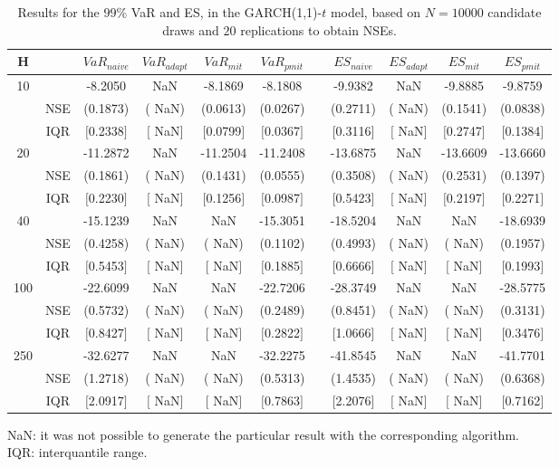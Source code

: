 \begin{table}[h] 
\centering 
\caption{Results for the $99\%$ VaR and ES, in the GARCH(1,1)-$t$ model, based on $N=10000$ candidate draws and $20$ replications to obtain NSEs.} 
\label{tab:res_algos_t_garch2_noS} 
\begin{tabular}{ccccccccccc}  
 H & & $VaR_{naive}$ & $VaR_{adapt}$ & $VaR_{mit}$  & $VaR_{pmit}$ &  & $ES_{naive}$ & $ES_{adapt}$ & $ES_{mit}$ & $ES_{pmit}$ \\ \hline 
10 & & -8.2050 &    NaN & -8.1869 & -8.1808 & & -9.9382 &    NaN & -9.8885 & -9.8759  \\ 
  & NSE & (0.1873) & (   NaN) & (0.0613) & (0.0267) & & (0.2711) & (   NaN) & (0.1541) & (0.0838)   \\ 
 & IQR & $[$0.2338$]$ & $[$   NaN$]$ & $[$0.0799$]$ & $[$0.0367$]$ & & $[$0.3116$]$ & $[$   NaN$]$ & $[$0.2747$]$ & $[$0.1384$]$  \\ [1ex] 
20 & & -11.2872 &    NaN & -11.2504 & -11.2408 & & -13.6875 &    NaN & -13.6609 & -13.6660  \\ 
  & NSE & (0.1861) & (   NaN) & (0.1431) & (0.0555) & & (0.3508) & (   NaN) & (0.2531) & (0.1397)   \\ 
 & IQR & $[$0.2230$]$ & $[$   NaN$]$ & $[$0.1256$]$ & $[$0.0987$]$ & & $[$0.5423$]$ & $[$   NaN$]$ & $[$0.2197$]$ & $[$0.2271$]$  \\ [1ex] 
40 & & -15.1239 &    NaN &    NaN & -15.3051 & & -18.5204 &    NaN &    NaN & -18.6939  \\ 
  & NSE & (0.4258) & (   NaN) & (   NaN) & (0.1102) & & (0.4993) & (   NaN) & (   NaN) & (0.1957)   \\ 
 & IQR & $[$0.5453$]$ & $[$   NaN$]$ & $[$   NaN$]$ & $[$0.1885$]$ & & $[$0.6666$]$ & $[$   NaN$]$ & $[$   NaN$]$ & $[$0.1993$]$  \\ [1ex] 
100 & & -22.6099 &    NaN &    NaN & -22.7206 & & -28.3749 &    NaN &    NaN & -28.5775  \\ 
  & NSE & (0.5732) & (   NaN) & (   NaN) & (0.2489) & & (0.8451) & (   NaN) & (   NaN) & (0.3131)   \\ 
 & IQR & $[$0.8427$]$ & $[$   NaN$]$ & $[$   NaN$]$ & $[$0.2822$]$ & & $[$1.0666$]$ & $[$   NaN$]$ & $[$   NaN$]$ & $[$0.3476$]$  \\ [1ex] 
250 & & -32.6277 &    NaN &    NaN & -32.2275 & & -41.8545 &    NaN &    NaN & -41.7701  \\ 
  & NSE & (1.2718) & (   NaN) & (   NaN) & (0.5313) & & (1.4535) & (   NaN) & (   NaN) & (0.6368)   \\ 
 & IQR & $[$2.0917$]$ & $[$   NaN$]$ & $[$   NaN$]$ & $[$0.7863$]$ & & $[$2.2076$]$ & $[$   NaN$]$ & $[$   NaN$]$ & $[$0.7162$]$  \\ [1ex] 
\hline 
\end{tabular} 
\raggedright 

\vspace{5pt}\footnotesize{NaN: it was not possible to generate the particular result with the corresponding algorithm.} \\ 
\vspace{5pt}\footnotesize{IQR: interquantile range.} 
\end{table} 

